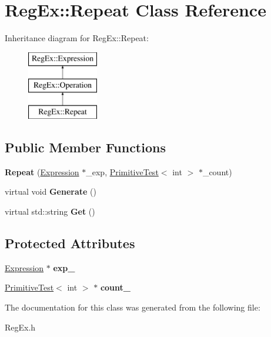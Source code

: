 \hypertarget{class_reg_ex_1_1_repeat}{}\section{Reg\+Ex\+:\+:Repeat Class Reference}
\label{class_reg_ex_1_1_repeat}
Inheritance diagram for Reg\+Ex\+:\+:Repeat\+:\begin{figure}[H]
\begin{center}
\leavevmode
\includegraphics[height=3.000000cm]{class_reg_ex_1_1_repeat}
\end{center}
\end{figure}
\subsection*{Public Member Functions}
\begin{DoxyCompactItemize}
\item 
\mbox{\label{class_reg_ex_1_1_repeat_a6889fa0984149563767aa76380621994}} 
{\bfseries Repeat} (\hyperlink{class_reg_ex_1_1_expression}{Expression} $\ast$\+\_\+exp, \hyperlink{class_primitive_test}{Primitive\+Test}$<$ int $>$ $\ast$\+\_\+count)
\item 
\mbox{\label{class_reg_ex_1_1_repeat_aa7f9520f00c1e283da55996f97fa0691}} 
virtual void {\bfseries Generate} ()
\item 
\mbox{\label{class_reg_ex_1_1_repeat_a8de75c8cc3dd1e781aaed6810a7d9cc3}} 
virtual std\+::string {\bfseries Get} ()
\end{DoxyCompactItemize}
\subsection*{Protected Attributes}
\begin{DoxyCompactItemize}
\item 
\mbox{\label{class_reg_ex_1_1_repeat_a68b7bb97e81f625484b995b97660b9f5}} 
\hyperlink{class_reg_ex_1_1_expression}{Expression} $\ast$ {\bfseries exp\+\_\+}
\item 
\mbox{\label{class_reg_ex_1_1_repeat_a8b286ece3065c515d7d43f402affdb48}} 
\hyperlink{class_primitive_test}{Primitive\+Test}$<$ int $>$ $\ast$ {\bfseries count\+\_\+}
\end{DoxyCompactItemize}


The documentation for this class was generated from the following file\+:\begin{DoxyCompactItemize}
\item 
Reg\+Ex.\+h\end{DoxyCompactItemize}
